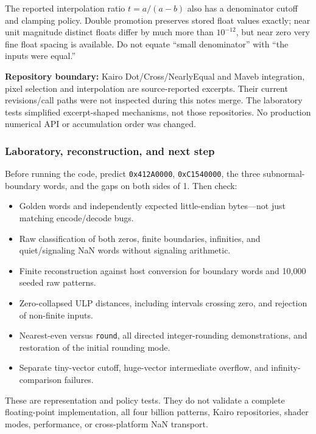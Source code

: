 The reported interpolation ratio \(t=a/(a-b)\) also has a denominator cutoff and clamping policy. Double promotion preserves stored float values exactly; near unit magnitude distinct floats differ by much more than \(10^{-12}\), but near zero very fine float spacing is available. Do not equate ``small denominator'' with ``the inputs were equal.''

\textbf{Repository boundary:} Kairo Dot/Cross/NearlyEqual and Maveb integration, pixel selection and interpolation are source-reported excerpts. Their current revisions/call paths were not inspected during this notes merge. The laboratory tests simplified excerpt-shaped mechanisms, not those repositories. No production numerical API or accumulation order was changed.

\subsubsection{Laboratory, reconstruction, and next step}\label{05-engine-i-ch001-laboratory-reconstruction-and-next-step}

Before running the code, predict \texttt{0x412A0000}, \texttt{0xC1540000}, the three subnormal-boundary words, and the gaps on both sides of 1. Then check:

\begin{itemize}
\tightlist
\item
  Golden words and independently expected little-endian bytes---not just matching encode/decode bugs.
\item
  Raw classification of both zeros, finite boundaries, infinities, and quiet/signaling NaN words without signaling arithmetic.
\item
  Finite reconstruction against host conversion for boundary words and 10,000 seeded raw patterns.
\item
  Zero-collapsed ULP distances, including intervals crossing zero, and rejection of non-finite inputs.
\item
  Nearest-even versus \texttt{round}, all directed integer-rounding demonstrations, and restoration of the initial rounding mode.
\item
  Separate tiny-vector cutoff, huge-vector intermediate overflow, and infinity-comparison failures.
\end{itemize}

These are representation and policy tests. They do not validate a complete floating-point implementation, all four billion patterns, Kairo repositories, shader modes, performance, or cross-platform NaN transport.

